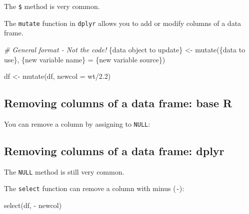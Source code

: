 \documentclass[
]{article}
\newenvironment{Shaded}{\begin{snugshade}}{\end{snugshade}}
\newcommand{\AttributeTok}[1]{\textcolor[rgb]{0.77,0.63,0.00}{#1}}
\newcommand{\CommentTok}[1]{\textcolor[rgb]{0.56,0.35,0.01}{\textit{#1}}}
\newcommand{\ConstantTok}[1]{\textcolor[rgb]{0.00,0.00,0.00}{#1}}
\newcommand{\FloatTok}[1]{\textcolor[rgb]{0.00,0.00,0.81}{#1}}
\newcommand{\FunctionTok}[1]{\textcolor[rgb]{0.00,0.00,0.00}{#1}}
\newcommand{\NormalTok}[1]{#1}
\newcommand{\OtherTok}[1]{\textcolor[rgb]{0.56,0.35,0.01}{#1}}
\newcommand{\SpecialCharTok}[1]{\textcolor[rgb]{0.00,0.00,0.00}{#1}}
\begin{document}
The \texttt{\$} method is very common.

The \texttt{mutate} function in \texttt{dplyr} allows you to add or
modify columns of a data frame.

\begin{Shaded}
\begin{Highlighting}[]
\CommentTok{\# General format {-} Not the code!}
\NormalTok{\{data object to update\} }\OtherTok{\textless{}{-}} \FunctionTok{mutate}\NormalTok{(\{data to use\}, }
\NormalTok{                                \{new variable name\} }\OtherTok{=}\NormalTok{ \{new variable source\}) }
\end{Highlighting}
\end{Shaded}

\begin{Shaded}
\begin{Highlighting}[]
\NormalTok{df }\OtherTok{\textless{}{-}} \FunctionTok{mutate}\NormalTok{(df, }\AttributeTok{newcol =}\NormalTok{ wt}\SpecialCharTok{/}\FloatTok{2.2}\NormalTok{)}
\end{Highlighting}
\end{Shaded}

\hypertarget{removing-columns-of-a-data-frame-base-r}{%
\subsection{Removing columns of a data frame: base
R}\label{removing-columns-of-a-data-frame-base-r}}

You can remove a column by assigning to \texttt{NULL}:

\begin{Shaded}
\end{Shaded}

\hypertarget{removing-columns-of-a-data-frame-dplyr}{%
\subsection{Removing columns of a data frame:
dplyr}\label{removing-columns-of-a-data-frame-dplyr}}

The \texttt{NULL} method is still very common.

The \texttt{select} function can remove a column with minus
(\texttt{-}):

\begin{Shaded}
\begin{Highlighting}[]
\FunctionTok{select}\NormalTok{(df, }\SpecialCharTok{{-}}\NormalTok{ newcol)}
\end{Highlighting}
\end{Shaded}
\end{document}
